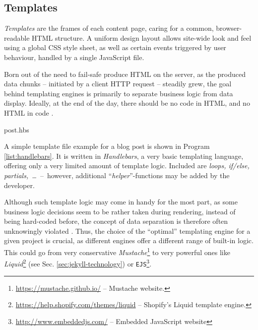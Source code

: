 \subsection{Templates}
\label{sec:buildpipelines-templates}

\emph{Templates} are the frames of each content page, caring for a common, browser-readable HTML structure. A uniform design layout allows site-wide look and feel using a global CSS style sheet, as well as certain events triggered by user behaviour, handled by a single JavaScript file.

Born out of the need to fail-safe produce HTML on the server, as the produced data chunks -- initiated by a client HTTP request -- steadily grew, the goal behind templating engines is primarily to separate business logic from data display. Ideally, at the end of the day, there should be no code in HTML, and no HTML in code \cite[225]{Parr2004templates}.

\begin{program}
  \caption{post.hbs}
  \label{list:handlebars}

\end{program}

A simple template file example for a blog post is shown in Program \ref{list:handlebars}. It is written in \emph{Handlebars}, a very basic templating language, offering only a very limited amount of template logic. Included are \emph{loops, if/else, partials,~\ldots}~--~however, additional ``\emph{helper}''-functions may be added by the developer.

Although such template logic may come in handy for the most part, as some business logic decisions seem to be rather taken during rendering, instead of being hard-coded before, the concept of data separation is therefore often unknowingly violated \cite[228]{Parr2004templates}. Thus, the choice of the ``optimal'' templating engine for a given project is crucial, as different engines offer a different range of built-in logic. This could go from very conservative \emph{Mustache}\footnote{\url{https://mustache.github.io/} -- Mustache website.} to very powerful ones like \emph{Liquid}\footnote{\url{https://help.shopify.com/themes/liquid} -- Shopify's Liquid template engine.} (see Sec. \ref{sec:jekyll-technology}) or \texttt{EJS}\footnote{\url{http://www.embeddedjs.com/} -- Embedded JavaScript website}.
